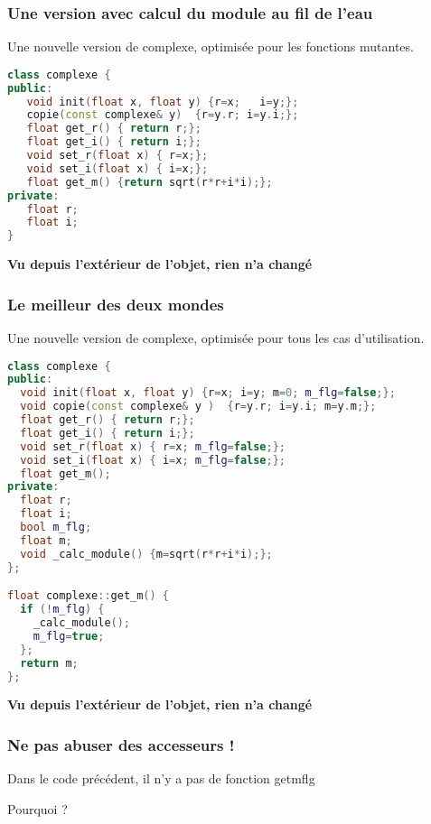 \documentclass{beamer}
\begin{document}
\begin{frame}[fragile=singleslide,shrink=20]
\frametitle {Une version avec calcul du module au fil de l'eau}
Une nouvelle version de complexe, optimisée pour les fonctions mutantes.

\begin{lstlisting}[language=c++]
class complexe {
public:
   void init(float x, float y) {r=x;   i=y;};
   copie(const complexe& y)  {r=y.r; i=y.i;};
   float get_r() { return r;};
   float get_i() { return i;};
   void set_r(float x) { r=x;};
   void set_i(float x) { i=x;};
   float get_m() {return sqrt(r*r+i*i);};
private:
   float r;
   float i;
}
\end{lstlisting}
\textbf{Vu depuis l'extérieur de l'objet, rien n'a changé }
\end{frame}

\begin{frame}[fragile=singleslide,shrink=20]
\frametitle {Le meilleur des deux mondes}
Une nouvelle version de complexe, optimisée pour tous les cas d'utilisation.

\begin{lstlisting}[language=c++]
class complexe {
public:
  void init(float x, float y) {r=x; i=y; m=0; m_flg=false;};
  void copie(const complexe& y )  {r=y.r; i=y.i; m=y.m;};
  float get_r() { return r;};
  float get_i() { return i;};
  void set_r(float x) { r=x; m_flg=false;};
  void set_i(float x) { i=x; m_flg=false;};
  float get_m();
private:
  float r;
  float i;
  bool m_flg;
  float m;
  void _calc_module() {m=sqrt(r*r+i*i);};
};

float complexe::get_m() {
  if (!m_flg) {
    _calc_module();
    m_flg=true;
  };
  return m;
};
\end{lstlisting}
\textbf{Vu depuis l'extérieur de l'objet, rien n'a changé }
\end{frame}

\begin{frame}[fragile=singleslide,shrink=20]
\frametitle {Ne pas abuser des accesseurs !}
Dans le code précédent, il n'y a pas de fonction getmflg

Pourquoi ?
\end{frame}
\end{document}
